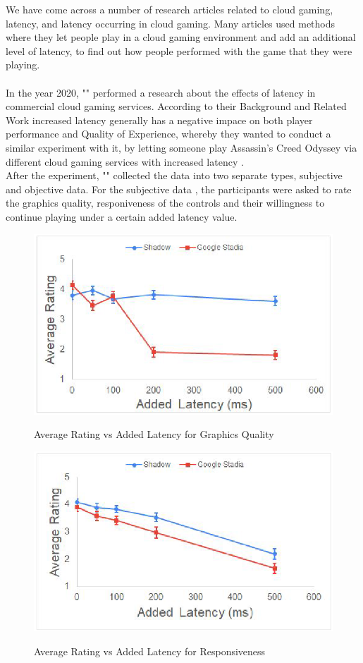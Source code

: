 We have come across a number of research articles related to cloud gaming, latency, and latency occurring in cloud gaming. Many articles used methods where they let people play in a cloud gaming environment and add an additional level of latency, to find out how people performed with the game that they were playing. 
\\\\
In the year 2020, "\citeauthor{desveaux2020effects}" performed a research about the effects of latency in commercial cloud gaming services. According to their Background and Related Work \parencite[Chapter 2.3, Page 17]{desveaux2020effects} increased latency generally has a negative impace on both player performance and Quality of Experience, whereby they wanted to conduct a similar experiment with it, by letting someone play Assassin's Creed Odyssey via different cloud gaming services with increased latency \parencite[Chapter 3, Page 18]{desveaux2020effects}.\\
After the experiment, "\citeauthor{desveaux2020effects}" collected the data into two separate types, subjective and objective data. For the subjective data \parencite[Chapter 4.2.2, Page 36]{desveaux2020effects}, the participants were asked to rate the graphics quality, responiveness of the controls and their willingness to continue playing under a certain added latency value.
\begin{figure}[H]
	\centering
	\includegraphics[width=12cm]{../img/fig13.png}
	\caption{Average Rating vs Added Latency for Graphics Quality}
	\parencite[Chapter 4.2.2, Page 36, Figure 13]{desveaux2020effects}
\end{figure}
\begin{figure}[H]
	\centering
	\includegraphics[width=12cm]{../img/fig14.png}
	\caption{Average Rating vs Added Latency for Responsiveness}
	\parencite[Chapter 4.2.2, Page 37, Figure 14]{desveaux2020effects}
\end{figure}
